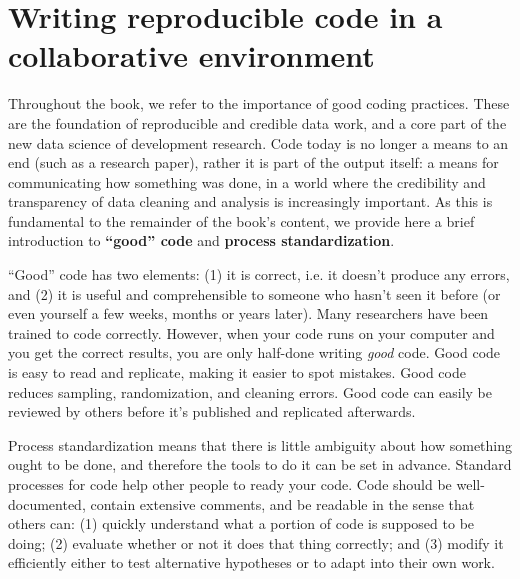 \section{Writing reproducible code in a collaborative environment}
Throughout the book, we refer to the importance of good coding practices.
These are the foundation of reproducible and credible data work,
and a core part of the new data science of development research.
Code today is no longer a means to an end (such as a research paper),
rather it is part of the output itself: a means for communicating how something was done,
in a world where the credibility and transparency of data cleaning and analysis is increasingly important.
As this is fundamental to the remainder of the book's content,
we provide here a brief introduction to \textbf{``good'' code} and \textbf{process standardization}.

``Good'' code has two elements: (1) it is correct, i.e. it doesn't produce any errors,
and (2) it is useful and comprehensible to someone who hasn't seen it before
(or even yourself a few weeks, months or years later).
Many researchers have been trained to code correctly.
However, when your code runs on your computer and you get the correct results,
you are only half-done writing \textit{good} code.
Good code is easy to read and replicate, making it easier to spot mistakes.
Good code reduces sampling, randomization, and cleaning errors.
Good code can easily be reviewed by others before it's published and replicated afterwards.

Process standardization means that there is
little ambiguity about how something ought to be done,
and therefore the tools to do it can be set in advance.
Standard processes for code help other people to ready your code.
Code should be well-documented, contain extensive comments, and be readable in the sense that others can:
(1) quickly understand what a portion of code is supposed to be doing;
(2) evaluate whether or not it does that thing correctly; and
(3) modify it efficiently either to test alternative hypotheses
or to adapt into their own work.

